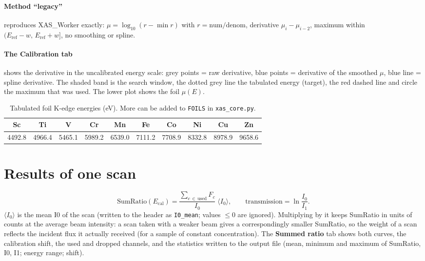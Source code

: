 \documentclass[11pt,a4paper]{article}
\newcommand{\ui}[1]{\textsf{\textbf{#1}}}          %
\newcommand{\file}[1]{\texttt{#1}}
\begin{document}
\paragraph{Method ``legacy''} reproduces XAS\_Worker exactly: $\mu = \log_{10}(r - \min r)$
with $r=\text{num}/\text{denom}$, derivative $\mu_{i}-\mu_{i-2}$, maximum within
$(E_\text{ref}-w,\,E_\text{ref}+w]$, no smoothing or spline.

\paragraph{The Calibration tab} shows the derivative in the uncalibrated energy
scale: grey points = raw derivative, blue points = derivative of the smoothed
$\mu$, blue line = spline derivative. The shaded band is the search window, the
dotted grey line the tabulated energy (target), the red dashed line and circle the
maximum that was used. The lower plot shows the foil $\mu(E)$.

\begin{table}[h]
\centering
\caption{Tabulated foil K-edge energies (eV). More can be added to \texttt{FOILS} in \file{xas\_core.py}.}
\label{tab:foils}
\begin{tabular}{@{}cccccccccc@{}}
\toprule
Sc & Ti & V & Cr & Mn & Fe & Co & Ni & Cu & Zn\\
\midrule
4492.8 & 4966.4 & 5465.1 & 5989.2 & 6539.0 & 7111.2 & 7708.9 & 8332.8 & 8978.9 & 9658.6\\
\bottomrule
\end{tabular}
\end{table}

\section{Results of one scan}
\[
  \text{SumRatio}(E_\text{cal}) = \frac{\sum_{c\,\in\,\text{used}} F_c}{I_0}\;\langle I_0\rangle,
  \qquad
  \text{transmission} = \ln\frac{I_0}{I_1}.
\]
$\langle I_0\rangle$ is the mean I0 of the scan (written to the header as \texttt{I0\_mean}; values
$\le 0$ are ignored). Multiplying by it keeps SumRatio in units of counts at the average beam
intensity: a scan taken with a weaker beam gives a correspondingly smaller SumRatio, so the
weight of a scan reflects the incident flux it actually received (for a sample of constant
concentration).
The \ui{Summed ratio} tab shows both curves, the calibration shift, the used and
dropped channels, and the statistics written to the output file (mean, minimum and
maximum of SumRatio, I0, I1; energy range; shift).
\end{document}
